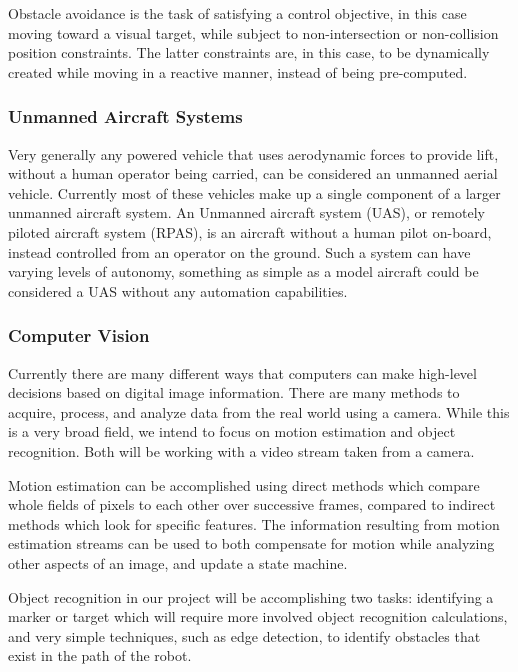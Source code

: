 \documentclass{article}
\begin{document}
		Obstacle avoidance is the task of satisfying a control objective, in this case moving toward a visual target, while subject to non-intersection or non-collision position constraints. The latter constraints are, in this case, to be dynamically created while moving in a reactive manner, instead of being pre-computed.
		
		\subsubsection{Unmanned Aircraft Systems}
		
		Very generally any powered vehicle that uses aerodynamic forces to provide lift, without a human operator being carried, can be considered an unmanned aerial vehicle. Currently most of these vehicles make up a single component of a larger unmanned aircraft system. An Unmanned aircraft system (UAS), or remotely piloted aircraft system (RPAS), is an aircraft without a human pilot on-board, instead controlled from an operator on the ground. Such a system can have varying levels of autonomy, something as simple as a model aircraft could be considered a UAS without any automation capabilities. 
		
		\subsubsection{Computer Vision}
		
		Currently there are many different ways that computers can make high-level decisions based on digital image information. There are many methods to acquire, process, and analyze data from the real world using a camera. While this is a very broad field, we intend to focus on motion estimation and object recognition. Both will be working with a video stream taken from a camera. 
		
		Motion estimation can be accomplished using direct methods which compare whole fields of pixels to each other over successive frames, compared to indirect methods which look for specific features. The information resulting from motion estimation streams can be used to both compensate for motion while analyzing other aspects of an image, and update a state machine.
		
		Object recognition in our project will be accomplishing two tasks: identifying a marker or target which will require more involved object recognition calculations, and very simple techniques, such as edge detection, to identify obstacles that exist in the path of the robot.
		
\end{document}
